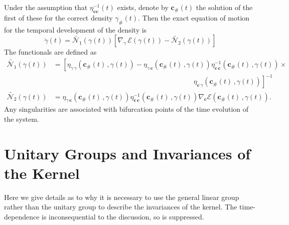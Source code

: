 \documentclass[aps,preprint]{revtex4}%
\begin{document}
Under the assumption that $\eta_{\mathbf{cc}}^{-1}(t)$ exists, denote by
$\mathbf{c}_{\#}(t)$ the solution of the first of these for the correct
density $\gamma_{\#}(t)$. Then the exact equation of motion for the temporal
development of the density is
\begin{equation}
\dot{\gamma}(t)=\tilde{\mathcal{N}_{1}}(\gamma(t))\left[  \nabla_{\gamma
}\,\mathcal{E}(\gamma(t))-\tilde{\mathcal{N}_{2}}(\gamma(t))\right]
\label{Appgammadot}%
\end{equation}
The functionals are defined as
\begin{align}
\tilde{\mathcal{N}_{1}}(\gamma(t))  &  =\left[  \eta_{\gamma\,\gamma
}(\mathbf{c}_{\#}(t)\,,\gamma(t))-\eta_{\gamma\,\mathbf{c}}(\mathbf{c}%
_{\#}(t)\,,\gamma(t))\eta_{\mathbf{c}\,\mathbf{c}}^{-1}(\mathbf{c}%
_{\#}(t)\,,\gamma(t))\right.  \times\nonumber\\
&  \qquad\qquad\qquad\qquad\qquad\qquad\qquad\qquad\qquad\qquad\left.
\eta_{\mathbf{c}\,\gamma}(\mathbf{c}_{\#}(t)\,,\gamma(t))\right]
^{-1}\nonumber\\
\tilde{\mathcal{N}_{2}}(\gamma(t))  &  =\eta_{\gamma\,\mathbf{c}}%
(\mathbf{c}_{\#}(t)\,,\gamma(t))\eta_{\mathbf{c}\,\mathbf{c}}^{-1}%
(\mathbf{c}_{\#}(t)\,,\gamma(t))\nabla_{\mathbf{c}}\mathcal{E}(\mathbf{c}%
_{\#}(t)\,,\gamma(t)).\quad
\end{align}
Any singularities are associated with bifurcation points of the time evolution
of the system.

\section{Unitary Groups and Invariances of the Kernel}

\noindent Here we give details as to why it is necessary to use the general
linear group rather than the unitary group to describe the invariances of the
kernel. The time-dependence is inconsequential to the discussion, so is suppressed.
\end{document}
